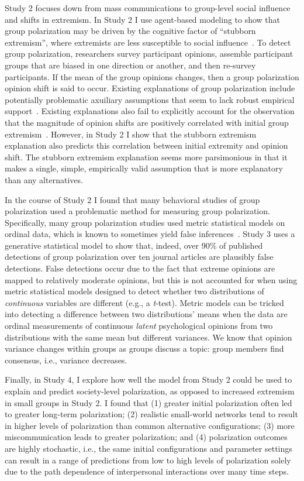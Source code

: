 Study 2 focuses down from
mass communications to group-level social influence and shifts in extremism.
In Study 2 I use agent-based modeling to show that group polarization 
may be driven by the cognitive factor of ``stubborn extremism'', where
extremists are less susceptible to social influence~\cite{Reiss2019,Zmigrod2019a}.
To detect group polarization, researchers survey participant
opinions, assemble participant groups that are biased in one direction or another, and then
re-survey participants. If the mean of the group opinions changes, then
a group polarization opinion shift is said to occur. Existing explanations of
group polarization include potentially
problematic axuiliary assumptions that seem to lack robust empirical support~\cite{Meehl1990}.
Existing explanations also fail to explicitly account for the observation that
the magnitude of opinion shifts are positively correlated with initial group
extremism~\cite{Myers1982}. However, in Study 2 I show that the stubborn extremism explanation
also predicts this correlation between initial extremity and opinion shift.
The stubborn extremism explanation seems more parsimonious in that
it makes a single, simple, empirically valid assumption that is more explanatory
than any alternatives.

In the course of Study 2 I found that many behavioral studies of
group polarization used a problematic method for measuring group polarization.
Specifically, many group polarization studies used metric statistical models
on ordinal data, which is known to sometimes yield false inferences~\cite{Liddell2018}.
Study 3 uses a generative statistical model to show that, indeed, over 90\% of 
published detections of group polarization over ten journal articles
are plausibly false detections. 
False detections occur due to the fact that extreme opinions are mapped to
relatively moderate opinions, but this is not accounted for when using 
metric statistical models designed to detect whether two distributions of
\emph{continuous} variables are different (e.g., a \emph{t}-test). Metric
models can be tricked into detecting a difference between two distributions' means when
the data are ordinal measurements of continuous \emph{latent} psychological opinions
from two distributions with the same mean but different variances. We know that
opinion variance changes within groups as groups discuss a topic: group members
find consensus, i.e., variance decreases.

Finally, in Study 4, I explore how well the
model from Study 2 could be used to explain and predict society-level
polarization, as opposed to increased extremism in small groups in Study 2.
I found that (1) greater initial polarization often led to greater long-term polarization; 
(2) realistic small-world networks tend to result in higher levels of
polarization than common alternative configurations; (3) more miscommunication
leads to greater polarization; and (4) polarization outcomes are
highly stochastic, i.e., the same initial configurations and
parameter settings can result in a range of predictions from low to high
levels of polarization solely due to the path dependence of interpersonal
interactions over many time steps.


